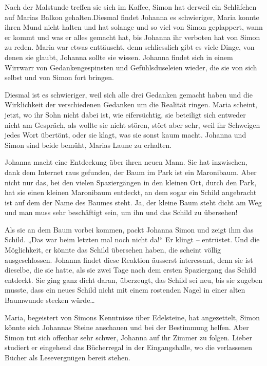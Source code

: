 \documentclass[10pt,titlepage,a5paper]{book}
\begin{document}
Nach der Malstunde treffen sie sich im Kaffee, Simon hat derweil ein Schläfchen auf Marias Balkon gehalten.Diesmal findet Johanna es schwieriger, Maria konnte ihren Mund nicht halten und hat solange und so viel von Simon geplappert, wann er kommt und was er alles gemacht hat, bis Johanna ihr verboten hat von Simon zu reden. Maria war etwas enttäuscht, denn schliesslich gibt es viele Dinge, von denen sie glaubt, Johanna sollte sie wissen. Johanna findet sich in einem Wirrwarr von Gedankengespinsten und Gefühlsduseleien wieder, die sie von sich selbst und von Simon fort bringen. 

Diesmal ist es schwieriger, weil sich alle drei Gedanken gemacht haben und die Wirklichkeit der verschiedenen Gedanken um die Realität ringen. Maria scheint, jetzt, wo ihr Sohn nicht dabei ist, wie eifersüchtig, sie beteiligt sich entweder nicht am Gespräch, als wollte sie nicht stören, stört aber sehr, weil ihr Schweigen jedes Wort übertönt, oder sie klagt, was sie sonst kaum macht. Johanna und Simon sind beide bemüht, Marias Laune zu erhalten.

Johanna macht eine Entdeckung über ihren neuen Mann. Sie hat inzwischen, dank dem Internet raus gefunden, der Baum im Park ist ein Maronibaum. Aber nicht nur das, bei den vielen Spaziergängen in den kleinen Ort, durch den Park, hat sie einen kleinen Maronibaum entdeckt, an dem sogar ein Schild angebracht ist auf dem der Name des Baumes steht. Ja, der kleine Baum steht dicht am Weg und man muss sehr beschäftigt sein, um ihn und das Schild zu übersehen!

Als sie an dem Baum vorbei kommen, packt Johanna Simon und zeigt ihm das Schild. „Das war beim letzten mal noch nicht da!“ Er klingt – entrüstet. Und die Möglichkeit, er könnte das Schild übersehen haben, die scheint völlig ausgeschlossen. Johanna findet  diese Reaktion äusserst interessant, denn sie ist dieselbe, die sie hatte, als sie zwei Tage nach dem ersten Spaziergang das Schild entdeckt. Sie ging ganz dicht daran, überzeugt, das Schild sei neu, bis sie zugeben musste, dass ein neues Schild nicht mit einem rostenden Nagel in einer alten Baumwunde stecken würde\dots 

Maria, begeistert von Simons Kenntnisse über Edelsteine, hat angezettelt, Simon könnte sich Johannas Steine anschauen und bei der Bestimmung helfen. Aber Simon tut sich offenbar sehr schwer, Johanna auf ihr Zimmer zu folgen. Lieber studiert er eingehend das Bücherregal in der Eingangshalle, wo die verlassenen Bücher als Lesevergnügen bereit stehen. 
\end{document}
